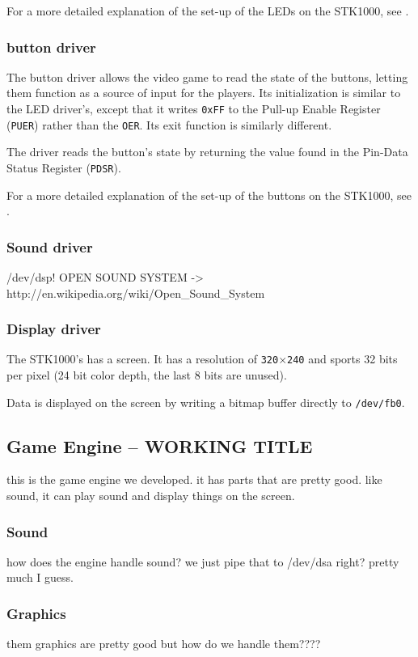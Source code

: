 		For a more detailed explanation of the set-up of the LEDs on the STK1000, see \cite{tdt4258-1}.
	\subsubsection{button driver}
		The button driver allows the video game to read the state of the buttons, letting them function as a source of input for the players.
		Its initialization is similar to the LED driver's, except that it writes \texttt{0xFF} to the Pull-up Enable Register (\texttt{PUER}) rather than the \texttt{OER}.
		Its exit function is similarly different.

		The driver reads the button's state by returning the value found in the Pin-Data Status Register (\texttt{PDSR}).



		For a more detailed explanation of the set-up of the buttons on the STK1000, see \cite{tdt4258-1}.
	\subsubsection{Sound driver}
		/dev/dsp!
		OPEN SOUND SYSTEM -> http://en.wikipedia.org/wiki/Open_Sound_System
	\subsubsection{Display driver}
		The STK1000's has a screen.
		It has a resolution of \texttt{320}$\times$\texttt{240} and sports 32 bits per pixel (24 bit color depth, the last 8 bits are unused)\cite{lab-compendium}.

		Data is displayed on the screen by writing a bitmap buffer directly to \texttt{/dev/fb0}.

\subsection{Game Engine -- WORKING TITLE}
	this is the game engine we developed. it has parts that are pretty good. like sound, it can play sound and display things on the screen.
	\subsubsection{Sound}
		how does the engine handle sound?
		we just pipe that to /dev/dsa right?
		pretty much I guess.
	\subsubsection{Graphics}
		them graphics are pretty good but how do we handle them????
